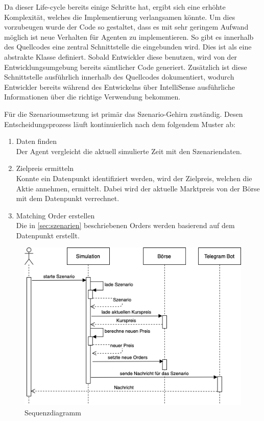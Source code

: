 Da dieser Life-cycle bereits einige Schritte hat, ergibt sich eine erhöhte Komplexität, welches die Implementierung verlangsamen könnte.
Um dies vorzubeugen wurde der Code so gestaltet, dass es mit sehr geringem Aufwand möglich ist neue Verhalten für Agenten zu implementieren. So gibt es innerhalb des Quellcodes eine zentral Schnittstelle die eingebunden wird. Dies ist als eine abstrakte Klasse definiert. Sobald Entwickler diese benutzen, wird von der Entwicklungsumgebung bereits sämtlicher Code generiert. Zusätzlich ist diese Schnittstelle ausführlich innerhalb des Quellcodes dokumentiert, wodurch Entwickler bereits während des Entwickelns über IntelliSense ausführliche Informationen über die richtige Verwendung bekommen.


Für die Szenarioumsetzung ist primär das Szenario-Gehirn zuständig. Desen Entscheidungsprozess läuft kontinuierlich nach dem folgendem Muster ab:
\begin{enumerate}
    \item Daten finden\\
        Der Agent vergleicht die aktuell simulierte Zeit mit den Szenariendaten.
    \item Zielpreis ermitteln\\
        Konnte ein Datenpunkt identifiziert werden, wird der Zielpreis, welchen die Aktie annehmen, ermittelt. Dabei wird der aktuelle Marktpreis von der Börse mit dem Datenpunkt verrechnet.
    \item Matching Order erstellen\\
        Die in \autoref{sec:szenarien} beschriebenen Orders werden basierend auf dem Datenpunkt erstellt.
\end{enumerate}

\begin{figure}[ht]
    \includegraphics[width=\textwidth]{img/Sequenzdiagramm.png}
    \centering
    \caption{Sequenzdiagramm}
    \label{fig:Sequenzdiagramm}
\end{figure}




















